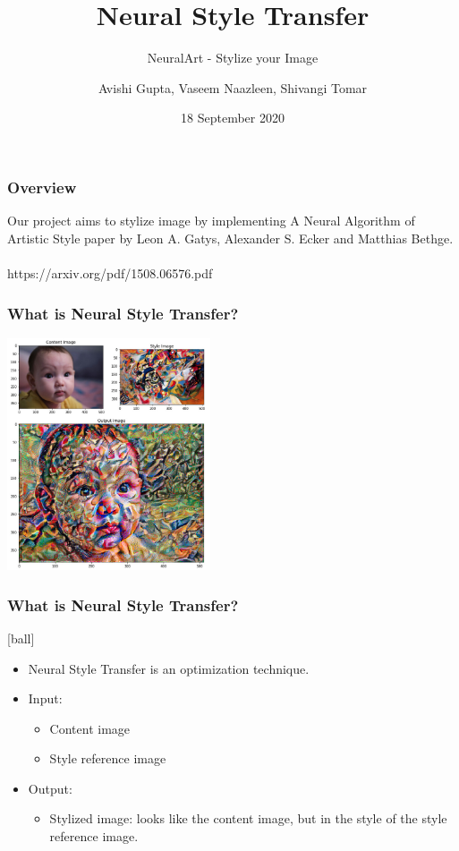 \documentclass[14pt]{beamer}
\title[NST]{Neural Style Transfer}
\subtitle{NeuralArt - Stylize your Image}
\author[Team - 38]{Avishi Gupta, Vaseem Naazleen, Shivangi Tomar}
\date{18 September 2020}
\begin{document}
\bgroup
{}
\begin{frame}[plain]{}
\end{frame}
\egroup


\begin{frame}
   \titlepage
\end{frame}

\begin{frame}
		\frametitle{Overview}
		Our project aims to stylize image by implementing A Neural Algorithm of Artistic Style paper by Leon A. Gatys, Alexander S. Ecker and Matthias Bethge. \\~\\

		https://arxiv.org/pdf/1508.06576.pdf
\end{frame}

\begin{frame}
    \frametitle{What is Neural Style Transfer?}
    \begin{center}
        \includegraphics[width=60mm]{baby.jpeg}
    \end{center}
\end{frame}

\begin{frame}
		\frametitle{What is Neural Style Transfer?}
		\begin{itemize}
            \item Neural Style Transfer is an optimization technique.
           \item Input:
		\begin{itemize}
		     \item Content image
		     \item Style reference image
		\end{itemize}
             \item Output:
		\begin{itemize}
             \item Stylized image: looks like the content image, but  in the style of the style
        reference image.
        \end{itemize}
        \end{itemize}
\end{frame}
\end{document}
